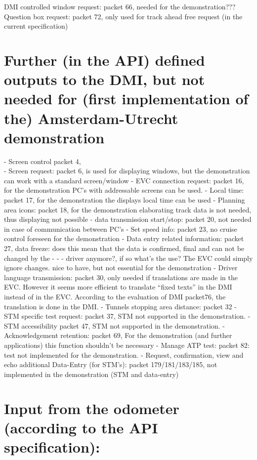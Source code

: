 \documentclass{template/openetcs_report}
\begin{document}
DMI controlled window request: packet 66,   needed for the demonstration???\\

Question box request: packet 72, only used for track ahead free request (in the current specification)\\


\section{Further (in the API) defined outputs to the DMI, but not needed for (first implementation of the) Amsterdam-Utrecht demonstration}
- Screen control packet 4,\\
- Screen request: packet 6, is used for displaying windows, but the demonstration can work with a standard screen/window
- EVC connection request: packet 16, for the demonstration PC's with addressable screens can be used.
- Local time: packet 17, for the demonstration the displays local time can be used
- Planning area icons: packet 18, for the demonstration elaborating track data is not needed, thus displaying not possible
- data transmission start/stop: packet 20, not needed in case of communication between PC's
- Set speed info: packet 23, no cruise control foreseen for the demonstration
- Data entry related information: packet 27,   data freeze: does this mean that the data is confirmed, final and can not be changed by the - - - driver anymore?, if so what's the use? The EVC could simply ignore changes. nice to have, but not essential for the demonstration
- Driver language transmission: packet 30, only needed if translations are made in the EVC. However it seems more efficient to translate “fixed texts” in the DMI instead of in the EVC. According to the evaluation of DMI packet76, the translation is done in the DMI.
- Tunnels stopping area distance: packet 32
- STM specific test request: packet 37, STM not supported in the demonstration.
- STM accessibility packet 47, STM not supported in the demonstration.
- Acknowledgement retention: packet 69, For the demonstration (and further applications) this function shouldn't be necessary
- Manage ATP test: packet 82: test not implemented for the demonstration.
- Request, confirmation, view and echo additional Data-Entry (for STM's): packet 179/181/183/185, not implemented in the demonstration (STM and data-entry)

\section{Input from the odometer (according to the API specification):}
\end{document}
